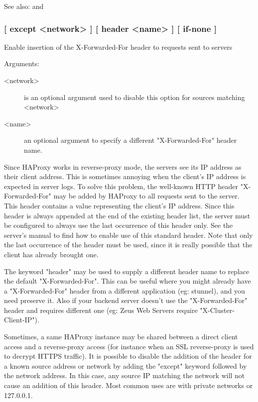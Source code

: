 See also:  and 

\subsubsection[forwardfor]{ [ except <network> ] [ header <name> ] [ if-none ]}

  Enable insertion of the X-Forwarded-For header to requests sent to servers


  Arguments:
\begin{description}
\item[<network>] is an optional argument used to disable this option for sources
              matching <network>
\item[<name>]    an optional argument to specify a different "X-Forwarded-For"
              header name.
\end{description}

  Since HAProxy works in reverse-proxy mode, the servers see its IP address as
  their client address. This is sometimes annoying when the client's IP address
  is expected in server logs. To solve this problem, the well-known HTTP header
  "X-Forwarded-For" may be added by HAProxy to all requests sent to the server.
  This header contains a value representing the client's IP address. Since this
  header is always appended at the end of the existing header list, the server
  must be configured to always use the last occurrence of this header only. See
  the server's manual to find how to enable use of this standard header. Note
  that only the last occurrence of the header must be used, since it is really
  possible that the client has already brought one.

  The keyword "header" may be used to supply a different header name to replace
  the default "X-Forwarded-For". This can be useful where you might already
  have a "X-Forwarded-For" header from a different application (eg: stunnel),
  and you need preserve it. Also if your backend server doesn't use the
  "X-Forwarded-For" header and requires different one (eg: Zeus Web Servers
  require "X-Cluster-Client-IP").

  Sometimes, a same HAProxy instance may be shared between a direct client
  access and a reverse-proxy access (for instance when an SSL reverse-proxy is
  used to decrypt HTTPS traffic). It is possible to disable the addition of the
  header for a known source address or network by adding the "except" keyword
  followed by the network address. In this case, any source IP matching the
  network will not cause an addition of this header. Most common uses are with
  private networks or 127.0.0.1.

